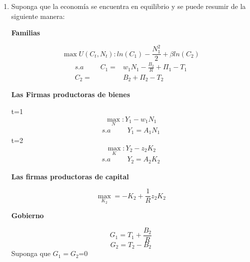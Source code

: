 \documentclass[a4paper,12pt]{article}
\begin{document}
\begin{enumerate}
Se pide que evalúe los siguientes casos, suponiendo que $\frac{dR}{dt}=0$: 
\begin{enumerate}[label=\alph*.\arabic*)]
        \item Caso 1: $\tau_1 = \tau_2 = \tau$
        \item Caso 2: $\tau_1 > \tau_2 $
        \item Caso 3: $\tau_1 < \tau_2 $
    \end{enumerate}

\newpage
  \item Suponga que la economía se encuentra en equilibrio y se puede resumir de la siguiente manera:

\textbf{Familias}

\begin{equation*}
\max U(C_t,N_t): ln (C_1)- \frac{N_1^2}{2} + \beta ln (C_2)  
\end{equation*}
\begin{align*}
    s.a \hspace{1cm} C_1=&w_1 N_1 -\frac{B_2}{R}+ \Pi_1-T_1\\
     C_2=&B_2 + \Pi_2-T_2
\end{align*}

\textbf{Las Firmas productoras de bienes}

t=1
\begin{equation*}
\max_{N} :Y_1 -w_1N_1 
\end{equation*}
\begin{align*}
    s.a \hspace{1cm} Y_1=A_1 N_1
\end{align*}
t=2
\begin{equation*}
\max_{K} :Y_2  - z_2 K_2
\end{equation*}
\begin{align*}
    s.a \hspace{1cm} Y_2=A_2 K_2
\end{align*}

\textbf{Las firmas productoras de capital}

\begin{equation*}
\max_{K_2} =-K_2+\frac{1}{R}z_2K_2
\end{equation*}


\textbf{Gobierno}

\begin{equation*}
    G_1= T_1 + \frac{B_2}{R}
\end{equation*}
\begin{equation*}
    G_2= T_2 - B_2
\end{equation*}
Suponga que $G_1=G_2$=0


\end{enumerate}
\end{document}

